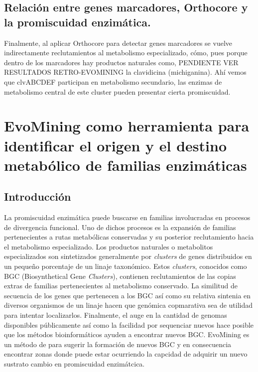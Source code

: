 \documentclass[12pt,twoside]{reedthesis}
\begin{document}
  \section{Relación entre genes marcadores, Orthocore y la promiscuidad
  enzimática.}\label{relacion-entre-genes-marcadores-orthocore-y-la-promiscuidad-enzimatica.}
  
  Finalmente, al aplicar Orthocore para detectar genes marcadores se
  vuelve indirectamente reclutamientos al metabolismo especializado, cómo,
  pues porque dentro de los marcadores hay productos naturales como,
  PENDIENTE VER RESULTADOS RETRO-EVOMINING la clavidicina (michiganina).
  Ahí vemos que clvABCDEF participan en metabolismo secundario, las
  enzimas de metabolismo central de este cluster pueden presentar cierta
  promiscuidad.
  
  \chapter{EvoMining como herramienta para identificar el origen y el
  destino metabólico de familias
  enzimáticas}\label{evomining-como-herramienta-para-identificar-el-origen-y-el-destino-metabolico-de-familias-enzimaticas}
  
  \section{Introducción}\label{introduccion-1}
  
  La promiscuidad enzimática puede buscarse en familias involucradas en
  procesos de divergencia funcional. Uno de dichos procesos es la
  expansión de familias pertenecientes a rutas metabólicas conservadas y
  su posterior reclutamiento hacia el metabolismo especializado. Los
  productos naturales o metabolitos especializados son sintetizados
  generalmente por \emph{clusters} de genes distribuidos en un pequeño
  porcentaje de un linaje taxonómico. Estos \emph{clusters}, conocidos
  como BGC (Biosynthetical Gene \emph{Clusters}), contienen reclutamientos
  de las copias extras de familias pertenecientes al metabolismo
  conservado. La similitud de secuencia de los genes que pertenecen a los
  BGC así como su relativa sintenia en diversos organismos de un linaje
  hacen que genómica copmarativa sea de utilidad para intentar
  localizarlos. Finalmente, el auge en la cantidad de genomas disponibles
  públicamente así como la facilidad por sequenciar nuevos hace posible
  que los métodos bioinformáticos ayuden a encontrar nuevos BGC. EvoMining
  es un método de para sugerir la formación de nuevos BGC y en
  consecuencia encontrar zonas donde puede estar ocurriendo la capcidad de
  adquirir un nuevo sustrato cambio en promiscuidad enzimátcica.
  
\end{document}
